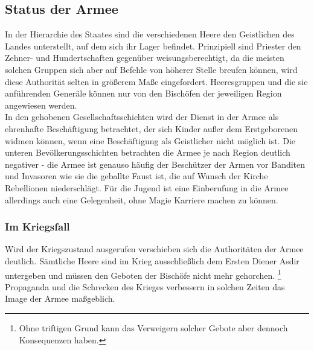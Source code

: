 \subsection{Status der Armee}
In der Hierarchie des Staates sind die verschiedenen Heere den Geistlichen des Landes unterstellt, auf dem sich ihr Lager befindet. 
Prinzipiell sind Priester den Zehner- und Hundertschaften gegenüber weisungsberechtigt, da die meisten solchen Gruppen sich aber auf Befehle von höherer Stelle breufen können, 
wird diese Authorität selten in größerem Maße eingefordert. 
Heeresgruppen und die sie anführenden Generäle können nur von den Bischöfen der jeweiligen Region angewiesen werden.\\
In den gehobenen Gesellschaftsschichten wird der Dienst in der Armee als ehrenhafte Beschäftigung betrachtet, der sich Kinder außer dem Erstgeborenen widmen können, wenn eine Beschäftigung als Geistlicher nicht möglich ist.
Die unteren Bevölkerungsschichten betrachten die Armee je nach Region deutlich negativer - die Armee ist genauso häufig der Beschützer der Armen vor Banditen und Invasoren wie sie die geballte Faust ist, die auf Wunsch der Kirche Rebellionen niederschlägt. 
Für die Jugend ist eine Einberufung in die Armee allerdings auch eine Gelegenheit, ohne Magie Karriere machen zu können.
\subsubsection{Im Kriegsfall}
Wird der Kriegszustand ausgerufen verschieben sich die Authoritäten der Armee deutlich. 
Sämtliche Heere sind im Krieg ausschließlich dem Ersten Diener Asdir untergeben und müssen den Geboten der Bischöfe nicht mehr gehorchen.
\footnote{Ohne triftigen Grund kann das Verweigern solcher Gebote aber dennoch Konsequenzen haben.}
Propaganda und die Schrecken des Krieges verbessern in solchen Zeiten das Image der Armee maßgeblich.

